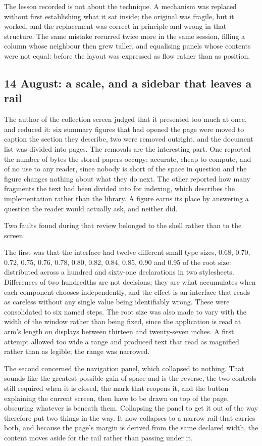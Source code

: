 \documentclass[11pt,a4paper]{article}
\begin{document}
The lesson recorded is not about the technique. A mechanism was replaced
without first establishing what it sat inside; the original was fragile, but it
worked, and the replacement was correct in principle and wrong in that
structure. The same mistake recurred twice more in the same session,
filling a column whose neighbour then grew taller, and equalising panels whose
contents were not equal: before the layout was expressed as flow rather than
as position.

\subsection{14 August: a scale, and a sidebar that leaves a rail}

The author of the collection screen judged that it presented too much at once,
and reduced it: six summary figures that had opened the page were moved to
caption the section they describe, two were removed outright, and the document
list was divided into pages. The removals are the interesting part. One
reported the number of bytes the stored papers occupy: accurate, cheap to
compute, and of no use to any reader, since nobody is short of the space in
question and the figure changes nothing about what they do next. The other
reported how many fragments the text had been divided into for indexing, which
describes the implementation rather than the library. A figure earns its place
by answering a question the reader would actually ask, and neither did.

Two faults found during that review belonged to the shell rather than to the
screen.

The first was that the interface had twelve different small type sizes,
0.68, 0.70, 0.72, 0.75, 0.76, 0.78, 0.80, 0.82, 0.84, 0.85, 0.90 and 0.95 of
the root size: distributed across a hundred and sixty-one declarations in
two stylesheets. Differences of two hundredths are not decisions; they are what
accumulates when each component chooses independently, and the effect is an
interface that reads as careless without any single value being identifiably
wrong. These were consolidated to six named steps. The root size was also made
to vary with the width of the window rather than being fixed, since the
application is read at arm's length on displays between thirteen and
twenty-seven inches. A first attempt allowed too wide a range and produced text
that read as magnified rather than as legible; the range was narrowed.

The second concerned the navigation panel, which collapsed to nothing. That
sounds like the greatest possible gain of space and is the reverse, the two
controls still required when it is closed, the mark that reopens it, and the
button explaining the current screen, then have to be drawn on top of the
page, obscuring whatever is beneath them. Collapsing the panel to get it out of
the way therefore put two things in the way. It now collapses to a narrow rail
that carries both, and because the page's margin is derived from the same
declared width, the content moves aside for the rail rather than passing under
it.
\end{document}

